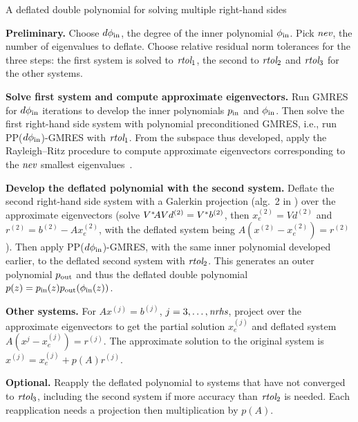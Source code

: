 \documentclass{siamart}
\def\nev{\mbox{{\it nev}}}
\def\rtol{\mbox{{\it rtol}}}
\def\nrhs{\mbox{{\it nrhs}}}
\def\dphiin{d\phi_{\rm in}}
\begin{document}
\begin{algorithm}
    \caption{A deflated double polynomial for solving multiple right-hand sides}
    \begin{description}
    \setcounter{enumi}{-1}
    \item[0.] {\bf Preliminary.}  Choose $\dphiin$, the degree of the inner polynomial $\phi_{\rm in}$.  Pick $\nev$, the number of eigenvalues to deflate.  Choose relative residual norm tolerances for the three steps: the first system is solved to $\rtol_1$, the second to $\rtol_2$ and $\rtol_3$ for the other systems.
    \item[1.] {\bf Solve first system and compute approximate eigenvectors.} Run GMRES for $\dphiin$ iterations to develop the inner polynomials $p_{\rm in}$ and $\phi_{\rm in}$.  Then solve the first right-hand side system with polynomial preconditioned GMRES, i.e., run PP($\dphiin$)-GMRES with $\rtol_1$.  From the subspace thus developed, apply the Rayleigh--Ritz procedure to compute approximate eigenvectors corresponding to the $\nev$ smallest eigenvalues~\cite{PPArn}.
    \item[2.] {\bf Develop the deflated polynomial with the second system.} Deflate the second right-hand side system with a Galerkin projection (alg.~2 in \cite{MGLE}) over the approximate eigenvectors (solve $V^*\kern-2pt AV d^{(2)} = V^* b^{(2)}$, then $x^{(2)}_e = V d^{(2)}$ and $r^{(2)} = b^{(2)} - A x^{(2)}_e$, with the deflated system being $A(x^{(2)} -x^{(2)}_e) = r^{(2)}$).  Then apply PP($\dphiin$)-GMRES, with the same inner polynomial developed earlier, to the deflated second system with $\rtol_2$.  This generates an outer polynomial $p_{\rm out}$ and thus the deflated double polynomial $p(z) = p_{\rm in}(z) p_{\rm out}(\phi_{\rm in}(z))$.  
    \item[3.] {\bf Other systems.}  For $A x^{(j)} = b^{(j)}$, $j=3,\ldots,\nrhs$, project over the approximate eigenvectors to get the partial solution $x_e^{(j)}$ and deflated system $A (x^{j} - x_e^{(j)}) = r^{(j)}$.  The approximate solution to the original system is $x^{(j)} = x_e^{(j)} + p(A) r^{(j)}$.   
    \item[4.] {\bf Optional.}  Reapply the deflated polynomial to systems that have not converged to $\rtol_3$, including the second system if more accuracy than $\rtol_2$ is needed.  Each  reapplication needs a projection then multiplication by $p(A)$.
\end{description}
\label{Alg:MultRHSDeflated}
\end{algorithm}
\end{document}
